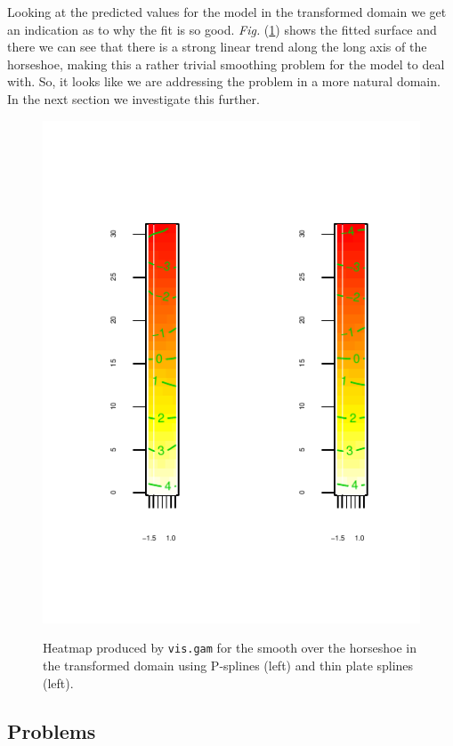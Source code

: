 \documentclass[a4paper,10pt]{amsart}
\newcommand{\Fig}[1]{\emph{Fig.} (\ref{#1})}
\begin{document}
Looking at the predicted values for the model in the transformed domain we get an indication as to why the fit is so good. \Fig{hsvisgam} shows the fitted surface and there we can see that there is a strong linear trend along the long axis of the horseshoe, making this a rather trivial smoothing problem for the model to deal with. So, it looks like we are addressing the problem in a more natural domain. In the next section we investigate this further.

\begin{figure}
\centering
\includegraphics[trim=0in 0.5in 0in 0in]{figs/hsvisgam.pdf} \\
\caption{Heatmap produced by \texttt{vis.gam} for the smooth over the horseshoe in the transformed domain using P-splines (left) and thin plate splines (left).}
\label{hsvisgam}
\end{figure}

\subsection{Problems}
\end{document}
